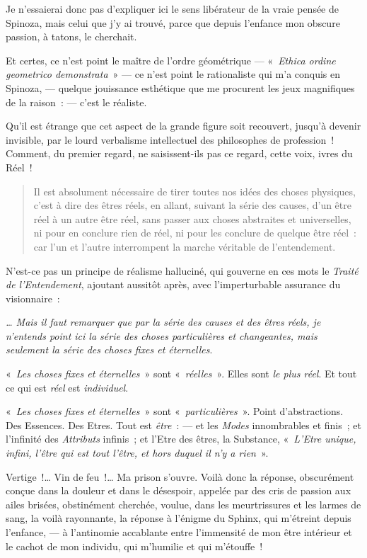 Je n'essaierai donc pas d'expliquer ici le sens libérateur de la vraie
pensée de Spinoza, mais celui que j'y ai trouvé, parce que depuis
l'enfance mon obscure passion, à tatons, le cherchait.

Et certes, ce n'est point le maître de l'ordre géométrique ---
«~\emph{Ethica ordine geometrico demonstrata}~» --- ce n'est point le
rationaliste qui m'a conquis en Spinoza, --- quelque jouissance
esthétique que me procurent les jeux magnifiques de la raison~: --- c'est
le réaliste.

Qu'il est étrange que cet aspect de la grande figure soit
recouvert, jusqu'à devenir invisible, par le lourd verbalisme
intellectuel des philosophes de profession~! Comment, du premier regard,
ne saisissent-ils pas ce regard, cette voix, ivres du Réel~!

\begin{quote}
Il est absolument nécessaire de tirer toutes nos idées des choses
physiques, c'est à dire des êtres réels, en allant, suivant la série des
causes, d'un être réel à un autre être réel, sans passer aux choses
abstraites et universelles, ni pour en conclure rien de réel, ni pour
les conclure de quelque être réel~: car l'un et l'autre interrompent la
marche véritable de l'entendement.
\end{quote}

N'est-ce pas un principe de réalisme halluciné, qui gouverne en ces mots
le \emph{Traité de l'Entendement}, ajoutant aussitôt
après, avec l'imperturbable assurance du visionnaire~:

\emph{\ldots{} Mais il faut remarquer que par la série des causes et des
êtres réels, je n'entends point ici la série des choses particulières et
changeantes, mais seulement la série des choses fixes et
éternelles}.

«~\emph{Les choses fixes et éternelles}~» sont «~\emph{réelles}~». Elles
sont \emph{le plus réel}. Et tout ce qui est \emph{réel} est
\emph{individuel}.

«~\emph{Les choses fixes et éternelles}~» sont
«~\emph{particulières}~». Point d'abstractions. Des
Essences. Des Etres. Tout est \emph{être~}: --- et les \emph{Modes}
innombrables et finis~; et l'infinité des \emph{Attributs} infinis~; et
l'Etre des êtres, la Substance, «~\emph{L'Etre unique, infini, l'être
qui est tout l'être, et hors duquel il n'y a rien}~».

Vertige~!\ldots{} Vin de feu~!\ldots{} Ma prison s'ouvre. Voilà donc la réponse,
obscurément conçue dans la douleur et dans le désespoir, appelée par des
cris de passion aux ailes brisées, obstinément cherchée, voulue, dans
les meurtrissures et les larmes de sang, la voilà rayonnante, la réponse
à l'énigme du Sphinx, qui m'étreint depuis l'enfance, --- à l'antinomie
accablante entre l'immensité de mon être intérieur et le cachot de mon
individu, qui m'humilie et qui m'étouffe~!

